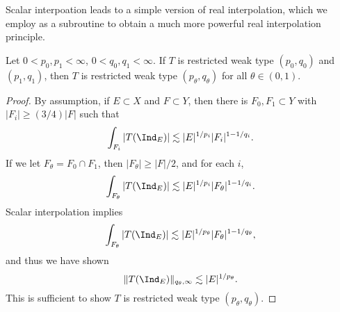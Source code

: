Scalar interpoation leads to a simple version of real interpolation, which we employ as a subroutine to obtain a much more powerful real interpolation principle.

\begin{lemma}
  Let $0 < p_0,p_1 < \infty$, $0 < q_0,q_1 < \infty$. If $T$ is restricted weak type $(p_0,q_0)$ and $(p_1,q_1)$, then $T$ is restricted weak type $(p_\theta,q_\theta)$ for all $\theta \in (0,1)$.
\end{lemma}
\begin{proof}
  By assumption, if $E \subset X$ and $F \subset Y$, then there is $F_0, F_1 \subset Y$ with $|F_i| \geq (3/4)|F|$ such that
  \[ \int_{F_i} |T(\Ind_E)| \lesssim |E|^{1/p_i} |F_i|^{1 - 1/q_i}. \]
  If we let $F_\theta = F_0 \cap F_1$, then $|F_\theta| \geq |F|/2$, and for each $i$,
  \[ \int_{F_\theta} |T(\Ind_E)| \lesssim |E|^{1/p_i} |F_\theta|^{1 - 1/q_i}. \]
  Scalar interpolation implies
  \[ \int_{F_\theta} |T(\Ind_E)| \lesssim |E|^{1/p_\theta} |F_\theta|^{1 - 1/q_\theta}, \]
  and thus we have shown
  \[ \| T(\Ind_E) \|_{q_\theta,\infty} \lesssim |E|^{1/p_\theta}. \]
  This is sufficient to show $T$ is restricted weak type $(p_\theta,q_\theta)$.
\end{proof}

